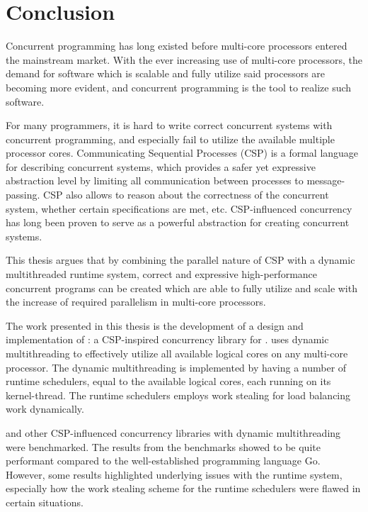 

\chapter{Conclusion}
\label{ch:conclusion}

Concurrent programming has long existed before multi\hyp{}core processors entered the mainstream market. With the ever increasing use of multi\hyp{}core processors, the demand for software which is scalable and fully utilize said processors are becoming more evident, and concurrent programming is the tool to realize such software.

For many programmers, it is hard to write correct concurrent systems with concurrent programming, and especially fail to utilize the available multiple processor cores. Communicating Sequential Processes (CSP) is a formal language for describing concurrent systems, which provides a safer yet expressive abstraction level by limiting all communication between processes to message\hyp{}passing. CSP also allows to reason about the correctness of the concurrent system, whether certain specifications are met, etc. CSP\hyp{}influenced concurrency has long been proven to serve as a powerful abstraction for creating concurrent systems.

This thesis argues that by combining the parallel nature of CSP with a dynamic multithreaded runtime system, correct and expressive high\hyp{}performance concurrent programs can be created which are able to fully utilize and scale with the increase of required parallelism in multi\hyp{}core processors.

The work presented in this thesis is the development of a design and implementation of \Proxc{}: a CSP\hyp{}inspired concurrency library for \Cpp{}. \Proxc{} uses dynamic multithreading to effectively utilize all available logical cores on any multi\hyp{}core processor. The dynamic multithreading is implemented by having a number of runtime schedulers, equal to the available logical cores, each running on its kernel\hyp{}thread. The runtime schedulers employs work stealing for load balancing work dynamically. 

\Proxc{} and other CSP\hyp{}influenced concurrency libraries with dynamic multithreading were benchmarked. The results from the benchmarks showed \Proxc{} to be quite performant compared to the well\hyp{}established programming language Go. However, some results highlighted underlying issues with the runtime system, especially how the work stealing scheme for the runtime schedulers were flawed in certain situations.

